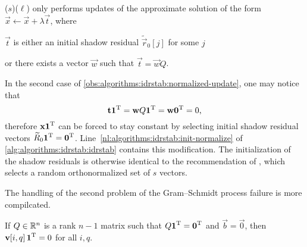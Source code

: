 \begin{obs}
  \label{obs:algorithms:idrstab:normalized-update}
  ($s$)($\ell$) only performs updates
  of the approximate solution of the form $\vec{x} \gets \vec{x} +
  \lambda \vec{t}$, where
  \begin{asparaenum}
  \item $\vec{t}$ is either an initial shadow
    residual $\tilde{\vec{r}}_0[j]$ for some $j$
  \item or there exists a vector $\vec{w}$ such that
    $\vec{t} = \vec{w} Q$.
  \end{asparaenum}
\end{obs}

In the second case of \cref{obs:algorithms:idrstab:normalized-update},
one may notice that
\begin{equation}
  \bm{\mathrm{t}} \bm{\mathrm{1}}^{\mathrm{T}} = \bm{\mathrm{w}} Q \bm{\mathrm{1}}^{\mathrm{T}} = \bm{\mathrm{w}} \bm{\mathrm{0}}^{\mathrm{T}} = 0
  \text,
\end{equation}
therefore $\bm{\mathrm{x}} \bm{\mathrm{1}}^{\mathrm{T}}$ can be forced to stay constant by
selecting initial shadow residual vectors
$\widetilde{R}_0 \bm{\mathrm{1}}^{\mathrm{T}} =
\bm{\mathrm{0}}^{\mathrm{T}}$.
Line~\ref{nl:algorithms:idrstab:init-normalize} of
\cref{alg:algorithms:idrstab:idrstab} contains this modification. The
initialization of the shadow residuals is otherwise identical to the
recommendation of \citet{sonneveld2010convergence}, which selects a
random orthonormalized set of $s$ vectors.

The handling of the second problem of the Gram--Schmidt process
failure is more compilcated.

\begin{obs}
  \label{obs:algorithms:idrstab:normalized-v}
  If $Q \in \mathbb{R}^n$ is a rank $n - 1$ matrix such that
  $Q \bm{\mathrm{1}}^{\mathrm{T}} = \bm{\mathrm{0}}^{\mathrm{T}}$ and $\vec{b} = \vec{0}$, then
  $\bm{\mathrm{v}}[i, q] \, \bm{\mathrm{1}}^{\mathrm{T}} = 0$ for all $i, q$.
\end{obs}

